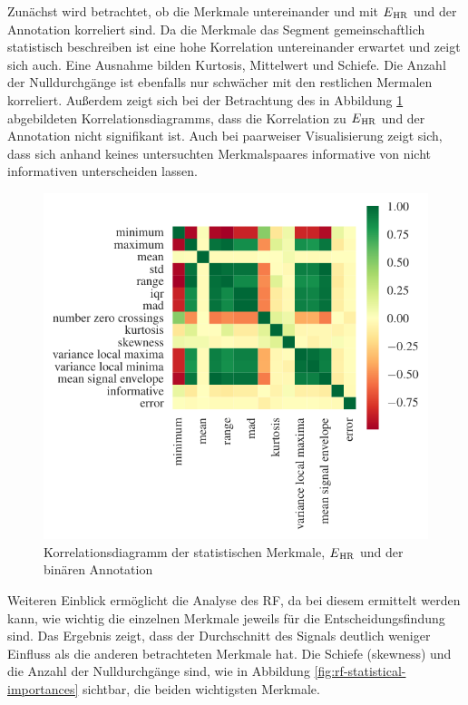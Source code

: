 Zunächst wird betrachtet, ob die Merkmale untereinander und mit $E\textsubscript{HR}$ und der Annotation korreliert sind. Da die Merkmale das Segment gemeinschaftlich statistisch beschreiben ist eine hohe Korrelation untereinander erwartet und zeigt sich auch. Eine Ausnahme bilden Kurtosis, Mittelwert und Schiefe. Die Anzahl der Nulldurchgänge ist ebenfalls nur schwächer mit den restlichen Mermalen korreliert. Außerdem zeigt sich bei der Betrachtung des in Abbildung \ref{fig:corr-heatmap-statistical} abgebildeten Korrelationsdiagramms, dass die Korrelation zu $E\textsubscript{HR}$ und der Annotation nicht signifikant ist. Auch bei paarweiser Visualisierung zeigt sich, dass sich anhand keines untersuchten Merkmalspaares informative von nicht informativen unterscheiden lassen.

\begin{figure}[H] %
	\centering
	\includegraphics[scale=0.95]{pic/corr-heatmap-statistical.pdf}
	\caption{Korrelationsdiagramm der statistischen Merkmale, $E\textsubscript{HR}$ und der binären Annotation}
	\label{fig:corr-heatmap-statistical}
\end{figure}

Weiteren Einblick ermöglicht die Analyse des \ac{RF}, da bei diesem ermittelt werden kann, wie wichtig die einzelnen Merkmale jeweils für die Entscheidungsfindung sind. Das Ergebnis zeigt, dass der Durchschnitt des Signals deutlich weniger Einfluss als die anderen betrachteten Merkmale hat. Die Schiefe (skewness) und die Anzahl der Nulldurchgänge sind, wie in Abbildung \ref{fig:rf-statistical-importances} sichtbar, die beiden wichtigsten Merkmale. 

